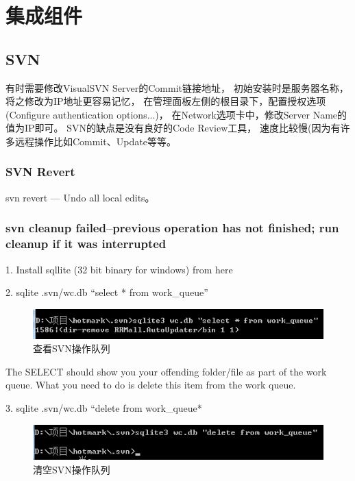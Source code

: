 \documentclass{book}
\begin{document}
\newpage

\chapter{集成组件}

\clearpage

\section{SVN}

有时需要修改VisualSVN Server的Commit链接地址，
初始安装时是服务器名称，将之修改为IP地址更容易记忆，
在管理面板左侧的根目录下，配置授权选项(Configure authentication options...)，
在Network选项卡中，修改Server Name的值为IP即可。
SVN的缺点是没有良好的Code Review工具，
速度比较慢(因为有许多远程操作比如Commit、Update等等。

\subsection{SVN Revert}

svn revert — Undo all local edits。

\subsection{svn cleanup failed–previous operation has not finished; run cleanup if it was interrupted}

1. Install sqllite (32 bit binary for windows) from here

2. sqlite .svn/wc.db “select * from work\_queue”

\begin{figure}[htbp]
	\centering
	\includegraphics[scale=1]{SQLiteCheckSvnOperaion.jpg}
	\caption{查看SVN操作队列}
	\label{SQLiteCheckSvnOperaion}
\end{figure}

The SELECT should show you your offending folder/file as part of the work queue.
 What you need to do is delete this item from the work queue.

3. sqlite .svn/wc.db “delete from work\_queue*

\begin{figure}[htbp]
	\centering
	\includegraphics[scale=1]{SQLiteDeleteOperation.jpg}
	\caption{清空SVN操作队列}
	\label{SQLiteDeleteOperation}
\end{figure}
\end{document}
